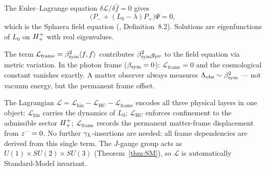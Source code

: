 \begin{theorem}
\label{thm:eom}
The Euler--Lagrange equation $\delta\mathcal{L}/\delta\bar f=0$ gives
\[
  \bigl(P_-+(L_0-\lambda)P_+\bigr)\Psi=0,
\]
which is the Sphaera field equation (\cite{brendecke2026rh}, Definition~8.2).
Solutions are eigenfunctions of $L_0$ on $H^+_+$ with real
eigenvalues.
\end{theorem}

\begin{proposition}
\label{prop:lambda-from-frame}
The term $\mathcal{L}_{\mathrm{frame}}=\beta_{\mathrm{sym}}^2\langle f,f\rangle$
contributes $\beta_{\mathrm{sym}}^2 g_{\mu\nu}$ to the field equation via metric
variation.
In the photon frame ($\beta_{\mathrm{sym}}=0$): $\mathcal{L}_{\mathrm{frame}}=0$
and the cosmological constant vanishes exactly.
A matter observer always measures $\Lambda_{\mathrm{obs}}\sim\beta_{\mathrm{sym}}^2$
--- not vacuum energy, but the permanent frame offset.
\end{proposition}

\begin{remark}
The Lagrangian $\mathcal{L}=\mathcal{L}_{\mathrm{kin}}
-\mathcal{L}_{\mathrm{HC}}-\mathcal{L}_{\mathrm{frame}}$ encodes all
three physical layers in one object:
$\mathcal{L}_{\mathrm{kin}}$ carries the dynamics of $L_0$;
$\mathcal{L}_{\mathrm{HC}}$ enforces confinement to the admissible
sector $H^+_+$;
$\mathcal{L}_{\mathrm{frame}}$ records the permanent matter-frame
displacement from $z^-=0$.
No further $\gamma_L$-insertions are needed: all frame dependencies are
derived from this single term.
The $J$-gauge group acts as $U(1)\times SU(2)\times SU(3)$
(Theorem~\ref{thm:SM}), so $\mathcal{L}$ is automatically
Standard-Model invariant.
\end{remark}


